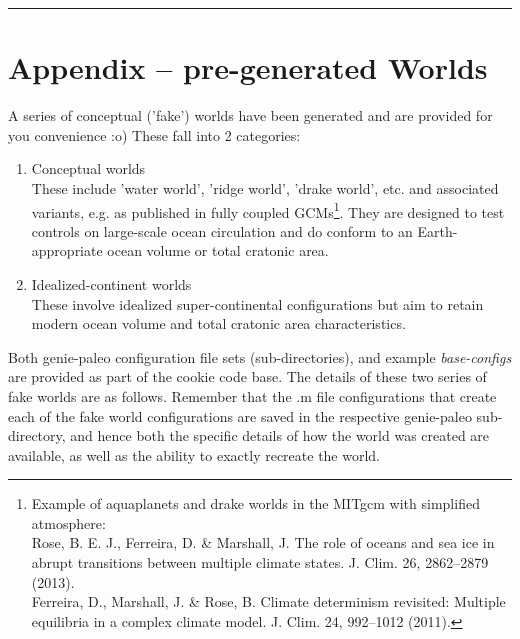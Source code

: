 \vspace{1mm}\noindent\rule{4cm}{0.5pt}\vspace{2mm}

\newpage

\section{Appendix -- pre-generated Worlds}

A series of conceptual ('fake') worlds have been generated and are provided for you convenience :o) These fall into 2 categories:

\begin{enumerate}[noitemsep]
\vspace{1mm}
\item Conceptual worlds
\\These include 'water world', 'ridge world', 'drake world', etc. and associated variants, e.g. as published in fully coupled GCMs\footnote{Example of aquaplanets and drake worlds in the MITgcm with simplified atmosphere:
\\Rose, B. E. J., Ferreira, D. \& Marshall, J. The role of oceans and sea ice in abrupt transitions between multiple climate states. J. Clim. 26, 2862–2879 (2013).
\\Ferreira, D., Marshall, J. \& Rose, B. Climate determinism revisited: Multiple equilibria in a complex climate model. J. Clim. 24, 992–1012 (2011).}. They are designed to test controls on large-scale ocean circulation and do conform to an Earth-appropriate ocean volume or total cratonic area.
\vspace{1mm}
\item Idealized-continent worlds
\\These involve idealized super-continental configurations but aim to retain modern ocean volume and total cratonic area characteristics.
\end{enumerate}
\vspace{1mm}

Both \textsf{\footnotesize genie-paleo} configuration file sets (sub-directories), and example \textit{base-configs} are provided as part of the cookie code base. The details of these two series of fake worlds are as follows. Remember that the \textsf{\footnotesize .m} file configurations that create each of the fake world configurations are saved in the respective \textsf{\footnotesize genie-paleo} sub-directory, and hence both the specific details of how the world was created are available, as well as the ability to exactly recreate the world.

